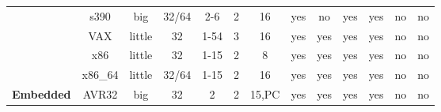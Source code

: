 \begin{sidewaystable}[tbp]
\begin{sf}
\begin{footnotesize}
\begin{center}
\begin{tabular}{|c|c||c|c|c|c|c|c|c|c|c|c|c|}
		 & %
s390             & %
big              & %
32/64            & %
2-6              & %
2                & %
16               & %
yes              & %
no               & %
yes              & %
yes              & %
no               & %
no                 %
\\
\cline{2-13}

                 & %
VAX              & %
little           & %
32               & %
1-54             & %
3                & %
16               & %
yes              & %
yes              & %
yes              & %
yes              & %
no               & %
no                 %
\\
\cline{2-13}

                 & %
x86              & %
little           & %
32               & %
1-15             & %
2                & %
8                & %
yes              & %
yes              & %
yes              & %
yes              & %
no               & %
no                 %
\\
\cline{2-13}

		 & %
x86\_64          & %
little           & %
32/64            & %
1-15             & %
2                & %
16               & %
yes              & %
yes              & %
yes              & %
yes              & %
no               & %
no                 %
\\

\hline\hline


\multirow{8}{*}{\bf Embedded} &
AVR32            & %
big              & %
32               & %
2                & %
2                & %
15,PC            & %
yes              & %
yes              & %
yes              & %
yes              & %
no               & %
no                 %
\\
\cline{2-13}


\end{tabular}
\end{center}
\end{footnotesize}
\end{sf}
\end{sidewaystable}
